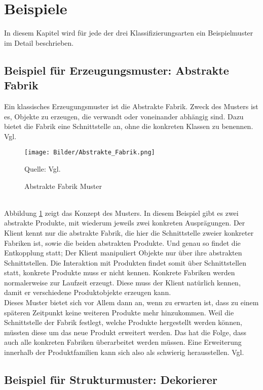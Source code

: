 \documentclass[fontsize=11pt,a4paper,final]{scrreprt}[2003/01/01]
\makeatletter
\def\ScaleIfNeeded{%
	\ifdim\Gin@nat@width>\linewidth
		\linewidth
	\else
		\Gin@nat@width
	\fi
}
\newcommand*{\quelle}{%
	\footnotesize Quelle: 
}
\makeatother
\begin{document}
\section{Beispiele}
In diesem Kapitel wird für jede der drei Klassifizierungsarten ein Beispielmuster im Detail beschrieben.

\subsection{Beispiel für Erzeugungsmuster: Abstrakte Fabrik}

Ein klassisches Erzeugungsmuster ist die Abstrakte Fabrik. Zweck des Musters ist es, Objekte zu erzeugen, die verwandt oder voneinander abhängig sind. Dazu bietet die Fabrik eine Schnittstelle an, ohne die konkreten Klassen zu benennen. Vgl. \cite[S. 107]{gamma2004}

\begin{figure}[H]
	\centering
	\texttt{[image: Bilder/Abstrakte\_Fabrik.png]}
	\caption{Abstrakte Fabrik Muster}
	\quelle{ Vgl. \cite[S. 109]{gamma2004}}
	\label{fig:Abstrakte_Fabrik}
\end{figure}
\ \\
Abbildung \ref{fig:Abstrakte_Fabrik} zeigt das Konzept des Musters. In diesem Beispiel gibt es zwei abstrakte Produkte, mit wiederum jeweils zwei konkreten Ausprägungen. Der Klient kennt nur die abstrakte Fabrik, die hier die Schnittstelle zweier konkreter Fabriken ist, sowie die beiden abstrakten Produkte. Und genau so findet die Entkopplung statt; Der Klient manipuliert Objekte nur über ihre abstrakten Schnittstellen. Die Interaktion mit Produkten findet somit über Schnittstellen statt, konkrete Produkte muss er nicht kennen. Konkrete Fabriken werden normalerweise zur Laufzeit erzeugt. Diese muss der Klient natürlich kennen, damit er verschiedene Produktobjekte erzeugen kann. \\
Dieses Muster bietet sich vor Allem dann an, wenn zu erwarten ist, dass zu einem späteren Zeitpunkt keine weiteren Produkte mehr hinzukommen. Weil die Schnittstelle der Fabrik festlegt, welche Produkte hergestellt werden können, müssten diese um das neue Produkt erweitert werden. Das hat die Folge, dass auch alle konkreten Fabriken überarbeitet werden müssen. Eine Erweiterung innerhalb der Produktfamilien kann sich also als schwierig herausstellen. Vgl. \cite[S. 109-111]{gamma2004}

\subsection{Beispiel für Strukturmuster: Dekorierer}
\end{document}
